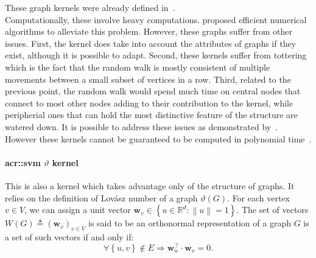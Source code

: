                     These graph kernels were already defined in~\parencite{gartner2003graph}.\\

                Computationally, these involve heavy computations.
                \textcite{vishwanathan2010graph} proposed efficient numerical algorithms to alleviate this problem.
                However, these graphs suffer from other issues.
                First, the kernel does take into account the attributes of graphs if they exist, although it is possible to adapt.
                Second, these kernels suffer from tottering which is the fact that the random walk is mostly consistent of multiple movements between a small subset of vertices in a row.
                Third, related to the previous point, the random walk would spend much time on central nodes that connect to most other nodes adding to their contribution to the kernel, while peripherial ones that can hold the most distinctive feature of the structure are watered down.
                It is possible to address these issues as demonstrated by~\textcite{horvath2004cyclic, mahe2004extensions}.
                However these kernels cannot be guaranteed to be computed in polynomial time~\parencite{vishwanathan2010graph}.

            \paragraph{\gls*{acr::svm} $\vartheta$ kernel}
                This is also a kernel which takes advantage only of the structure of graphs.
                It relies on the definition of Lov\'asz number of a graph $\vartheta(G)$.
                For each vertex $v \in V$, we can assign a unit vector \(\bm{w}_v \in \left\{u \in \mathbb{R}^d: \left\lVert u \right\rVert = 1 \right\}\).
                The set of vectors \(W(G) \triangleq \left(\bm{w}_v\right)_{v \in V}\) is said to be an orthonormal representation of a graph $G$ is a set of such vectors if and only if:
                \begin{equation*}
                    \forall \left\{u,v\right\} \notin E \Rightarrow \bm{w}_u^\intercal\cdot \bm{w}_v=0.
                \end{equation*}

